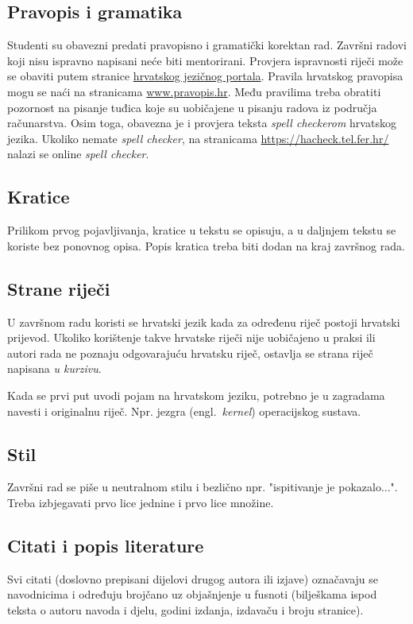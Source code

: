 \subsection{Pravopis i gramatika}

Studenti su obavezni predati pravopisno i gramatički korektan rad. Završni radovi koji nisu ispravno napisani neće biti mentorirani. Provjera ispravnosti riječi može se obaviti putem stranice \href{http://hjp.novi-liber.hr/}{hrvatskog jezičnog portala}. Pravila hrvatskog pravopisa mogu se naći na stranicama \href{www.pravopis.hr}{www.pravopis.hr}. Među pravilima treba obratiti pozornost na pisanje tuđica koje su uobičajene u pisanju radova iz područja računarstva. Osim toga, obavezna je i provjera teksta \textit{spell checkerom} hrvatskog jezika. Ukoliko nemate \textit{spell checker}, na stranicama \url{https://hacheck.tel.fer.hr/} nalazi se online \textit{spell checker}.
\subsection{Kratice}

Prilikom prvog pojavljivanja, kratice u tekstu se opisuju, a u daljnjem tekstu se koriste bez ponovnog opisa. Popis kratica treba biti dodan na kraj završnog rada.
\subsection{Strane riječi}
U završnom radu koristi se hrvatski jezik kada za određenu riječ postoji hrvatski prijevod. Ukoliko korištenje takve hrvatske riječi nije 
uobičajeno u praksi ili autori rada ne 
poznaju odgovarajuću hrvatsku riječ, ostavlja se strana riječ napisana \textit{u kurzivu}.

Kada se prvi put uvodi pojam na hrvatskom jeziku, potrebno je u zagradama navesti i originalnu riječ. Npr. jezgra (engl.~\textit{kernel}) operacijskog sustava.  
\subsection{Stil}

Završni rad se piše u neutralnom stilu i bezlično npr. "ispitivanje je pokazalo...". 
Treba izbjegavati prvo lice jednine i prvo lice množine. 
\subsection{Citati i popis literature}

Svi citati (doslovno prepisani dijelovi drugog autora ili izjave) označavaju se navodnicima i
određuju brojčano uz objašnjenje u fusnoti (bilješkama ispod teksta o autoru navoda i djelu, godini izdanja, izdavaču i broju stranice).

